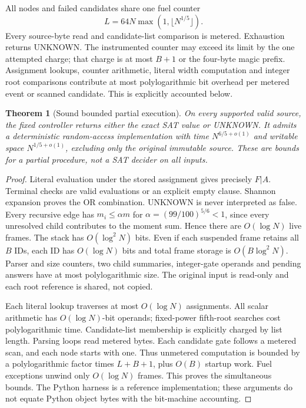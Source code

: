 \documentclass[11pt]{article}
\newtheorem{theorem}{Theorem}
\begin{document}
All nodes and failed candidates share one fuel counter
\[
 L=64N\max(1,\lfloor N^{1/5}\rfloor).
\]
Every source-byte read and candidate-list comparison is metered. Exhaustion
returns UNKNOWN. The instrumented counter may exceed its limit by the one
attempted charge; that charge is at most $B+1$ or the four-byte magic prefix.
Assignment lookups, counter arithmetic, literal width computation and integer
root comparisons contribute at most polylogarithmic bit overhead per metered
event or scanned candidate. This is explicitly accounted below.

\begin{theorem}[Sound bounded partial execution]
On every supported valid source, the fixed controller returns either the exact
SAT value or UNKNOWN. It admits a deterministic random-access implementation
with time $N^{6/5+o(1)}$ and writable space $N^{1/5+o(1)}$, excluding only the
original immutable source. These are bounds for a partial procedure, not a
SAT decider on all inputs.
\end{theorem}
\begin{proof}
Literal evaluation under the stored assignment gives precisely $F|A$.
Terminal checks are valid evaluations or an explicit empty clause. Shannon
expansion proves the OR combination. UNKNOWN is never interpreted as false.
Every recursive edge has $m_i\le\alpha m$ for
$\alpha=(99/100)^{5/6}<1$, since every unresolved child contributes to the
moment sum. Hence there are $O(\log N)$ live frames. The stack has
$O(\log^2 N)$ bits. Even if each suspended frame retains all $B$ IDs, each
ID has $O(\log N)$ bits and total frame storage is
$O(B\log^2 N)$. Parser and size counters, two child summaries, integer-gate
operands and pending answers have at most polylogarithmic size. The original
input is read-only and each root reference is shared, not copied.

Each literal lookup traverses at most $O(\log N)$ assignments. All scalar
arithmetic has $O(\log N)$-bit operands; fixed-power fifth-root searches cost
polylogarithmic time. Candidate-list membership is explicitly charged by list
length. Parsing loops read metered bytes. Each candidate gate follows a
metered scan, and each node starts with one. Thus unmetered computation is
bounded by a polylogarithmic factor times $L+B+1$, plus $O(B)$ startup work.
Fuel exceptions unwind only $O(\log N)$ frames. This proves the simultaneous
bounds. The Python harness is a reference implementation; these arguments do
not equate Python object bytes with the bit-machine accounting.
\end{proof}
\end{document}
